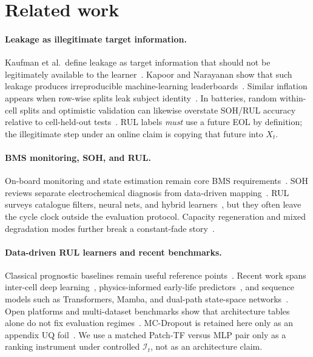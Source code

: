 \documentclass[preprint,12pt]{elsarticle}
\begin{document}
\section{Related work}
\label{sec:related}

\paragraph{Leakage as illegitimate target information.}
Kaufman et al.\ define leakage as target information that should not be legitimately available to the learner~\cite{kaufman2012leakage}.
Kapoor and Narayanan show that such leakage produces irreproducible machine-learning leaderboards~\cite{kapoor2023leakage}.
Similar inflation appears when row-wise splits leak subject identity~\cite{rosenblatt2024}.
In batteries, random within-cell splits and optimistic validation can likewise overstate SOH/RUL accuracy relative to cell-held-out tests~\cite{barua2026predictor,ali2026loco}.
RUL labels \emph{must} use a future EOL by definition; the illegitimate step under an online claim is copying that future into $X_t$.

\paragraph{BMS monitoring, SOH, and RUL.}
On-board monitoring and state estimation remain core BMS requirements~\cite{hu2019rser}.
SOH reviews separate electrochemical diagnosis from data-driven mapping~\cite{xiong2018soh}.
RUL surveys catalogue filters, neural nets, and hybrid learners~\cite{lipu2018,wang2024gce,xu2025meas,yang2025batteries}, but they often leave the cycle clock outside the evaluation protocol.
Capacity regeneration and mixed degradation modes further break a constant-fade story~\cite{birkl2017,aliakbari2025fusedr,fan2026meas}.

\paragraph{Data-driven RUL learners and recent benchmarks.}
Classical prognostic baselines remain useful reference points~\cite{saha2009compare}.
Recent work spans inter-cell deep learning~\cite{zhang2025batlinet}, physics-informed early-life predictors~\cite{deng2025piml,oyewole2025uq}, and sequence models such as Transformers, Mamba, and dual-path state-space networks~\cite{vaswani2017,nie2023patchtst,huang2025rulmamba,li2026dpmamba,sun2026sgdits,yi2025jps,tian2025energy,ge2025koopman,li2025adapt,wang2025jes}.
Open platforms and multi-dataset benchmarks show that architecture tables alone do not fix evaluation regimes~\cite{zhang2024batteryml,tan2025batterylife,li2024lifetime}.
MC-Dropout is retained here only as an appendix UQ foil~\cite{gal2016}.
We use a matched Patch-TF versus MLP pair only as a ranking instrument under controlled $\mathcal{I}_t$, not as an architecture claim.
\end{document}
